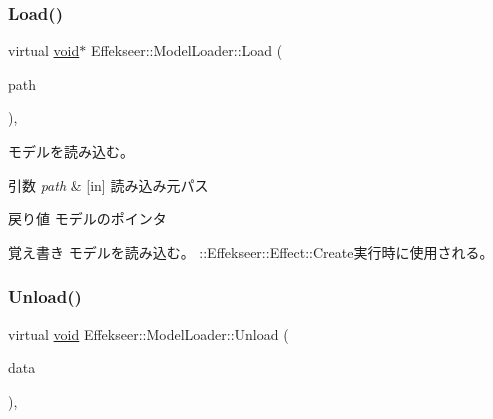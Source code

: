 \subsubsection{\texorpdfstring{Load()}{Load()}}
{\footnotesize\ttfamily virtual \mbox{\hyperlink{namespace_effekseer_ab34c4088e512200cf4c2716f168deb56}{void}}$\ast$ Effekseer\+::\+Model\+Loader\+::\+Load (\begin{DoxyParamCaption}\item[{const \mbox{\hyperlink{_effekseer_8h_a50b026abea014b47854bcd835b3b6233}{E\+F\+K\+\_\+\+C\+H\+AR}} $\ast$}]{path }\end{DoxyParamCaption})\hspace{0.3cm}{\ttfamily [inline]}, {\ttfamily [virtual]}}



モデルを読み込む。 


\begin{DoxyParams}{引数}
{\em path} & \mbox{[}in\mbox{]} 読み込み元パス \\
\hline
\end{DoxyParams}
\begin{DoxyReturn}{戻り値}
モデルのポインタ 
\end{DoxyReturn}
\begin{DoxyNote}{覚え書き}
モデルを読み込む。 \+::\+Effekseer\+::\+Effect\+::\+Create実行時に使用される。 
\end{DoxyNote}
\mbox{\label{class_effekseer_1_1_model_loader_a496f93a8615363ff31943adb205b5365}} 
\subsubsection{\texorpdfstring{Unload()}{Unload()}}
{\footnotesize\ttfamily virtual \mbox{\hyperlink{namespace_effekseer_ab34c4088e512200cf4c2716f168deb56}{void}} Effekseer\+::\+Model\+Loader\+::\+Unload (\begin{DoxyParamCaption}\item[{\mbox{\hyperlink{namespace_effekseer_ab34c4088e512200cf4c2716f168deb56}{void}} $\ast$}]{data }\end{DoxyParamCaption})\hspace{0.3cm}{\ttfamily [inline]}, {\ttfamily [virtual]}}



